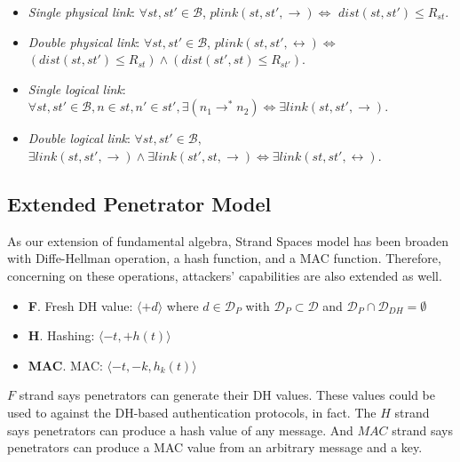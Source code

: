 \begin{Definition}
\begin{itemize}
\item \emph{Single physical link}: $\forall st,st' \in \mathcal{B}$, $plink(st,st', \rightarrow) \Leftrightarrow$ $dist(st,st') \le R_{st}$.
\item \emph{Double physical link}: $\forall st,st' \in \mathcal{B}$, $plink(st,st', \leftrightarrow) \Leftrightarrow$ $(dist(st,st') \le R_{st}) \wedge (dist(st',st) \le R_{st'})$.
\item \emph{Single logical link}: $\forall st, st' \in \mathcal{B}, n \in st, n' \in st', \exists (n_1 \rightarrow^* n_2) \Leftrightarrow \exists link(st, st',\rightarrow)$.
\item \emph{Double logical link}: $\forall st, st' \in \mathcal{B},$ $ \exists link(st, st',\rightarrow) \wedge \exists link(st', st,\rightarrow) \Leftrightarrow \exists link(st, st',\leftrightarrow)$.
\end{itemize}	

\end{Definition}

\subsection{Extended Penetrator Model}\label{penndp}

As our extension of fundamental algebra, Strand Spaces model has been broaden with Diffe-Hellman operation, a hash function, and a MAC function. Therefore, concerning on these operations, attackers' capabilities are also extended as well. 

\begin{itemize}
\item \textbf{F}. Fresh DH value: $\langle +d  \rangle$ where $d \in \mathcal{D}_P$ with $\mathcal{D}_P \subset \mathcal{D}$ and $\mathcal{D}_P \cap \mathcal{D}_{DH}=\emptyset$
\item \textbf{H}. Hashing: $\langle -t,+h(t)  \rangle$ 
\item \textbf{MAC}. MAC: $\langle -t,-k, h_k(t)  \rangle$ 
\end{itemize} 

$F$ strand says penetrators can generate their DH values. These values could be used to against the DH-based authentication protocols, in fact. The $H$ strand says penetrators can produce a hash value of any message. And $MAC$ strand says penetrators can produce a MAC value from an arbitrary message and a key. 
 
